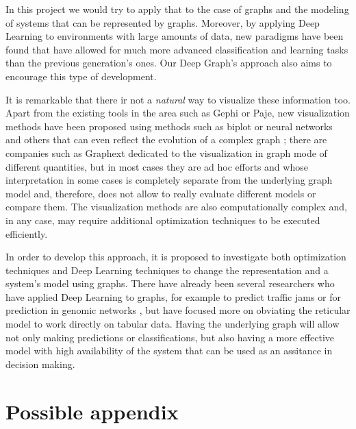 \documentclass[runningheads,a4paper]{llncs}
\begin{document}
In this project we would try to apply that to the case of graphs and
the modeling of systems that can be represented by graphs. Moreover,
by applying Deep Learning to environments with large amounts of data,
new paradigms have been found that have allowed for much more advanced
classification and learning tasks than the previous generation's
ones. Our Deep Graph's approach also aims to encourage this type of
development.


It is remarkable that there ir not a \textit{natural} way to visualize these
information too. Apart from the existing tools in the area such as
Gephi or Paje, new visualization methods have been proposed using
methods such as biplot \cite{torres2013use} or neural networks
\cite{blogtalk2jj} and others that can even reflect the evolution of a
complex graph \cite{weblogs-JNCA}; there are companies such as Graphext
dedicated to the visualization in graph mode of different quantities,
but in most cases they are ad hoc efforts and whose interpretation in
some cases is completely separate from the underlying graph model and,
therefore, does not allow to really evaluate different models or
compare them. The visualization methods are also computationally
complex and, in any case, may require additional optimization
techniques to be executed efficiently. 

In order to develop this approach, it is proposed to investigate both
optimization techniques and Deep Learning techniques to change the
representation and a system's model using graphs. There have already
been several researchers who have applied Deep Learning to graphs, for
example to predict traffic jams \cite{ma2015} or for prediction in genomic
networks \cite{park2015deep}, but have focused more on obviating the
reticular model to work directly on tabular data. Having the
underlying graph will allow not only making predictions or
classifications, but also having a more effective model with high
availability of the system that can be used as an assitance in
decision making. 





\section*{Possible appendix}
\end{document}
